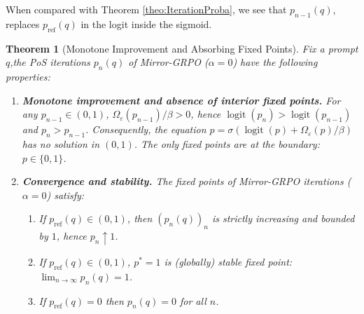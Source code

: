 \documentclass[11pt,reqno]{amsart}
\newtheorem{theorem}{Theorem}
\DeclareMathOperator{\logit}{logit}
\begin{document}
When compared with Theorem \ref{theo:IterationProba}, we see that $p_{n-1}(q)$, replaces $p_{\mathrm{ref}}(q)$ in the logit inside the sigmoid. 

\begin{theorem}[Monotone Improvement and Absorbing Fixed Points]
Fix a prompt $q$,the PoS iterations $p_n(q)$  of Mirror-GRPO ($\alpha=0$) have the following properties:

\begin{enumerate}[leftmargin=1.1em, itemsep=4pt, topsep=4pt]

\item\textbf{Monotone improvement and absence of interior fixed points.}
For any $p_{n-1}\in(0,1)$, $\Omega_\varepsilon(p_{n-1})/\beta>0$, hence $\logit(p_n)>\logit(p_{n-1})$ and $p_n>p_{n-1}$.
Consequently, the equation $p=\sigma(\logit(p)+\Omega_\varepsilon(p)/\beta)$ has \emph{no} solution in $(0,1)$.
The only fixed points are at the boundary: $p\in\{0,1\}$.

\item\textbf{Convergence and stability.} The fixed points of Mirror-GRPO iterations ($\alpha=0$) satisfy:  
\begin{enumerate}[label=(\alph*), itemsep=3pt]
\item If $p_{\mathrm{ref}}(q)\in(0,1)$, then $(p_n(q))_{n}$ is strictly increasing and bounded by $1$, hence $p_n\uparrow 1$.
\item  If $p_{\mathrm{ref}}(q)\in (0,1)$,  $p^*=1$ is (globally)  stable fixed point: $\lim_{n\to\infty}p_n(q)=1$.
\item If $p_{\mathrm{ref}}(q)=0$ then $p_n(q)= 0$ for all $n$.
\end{enumerate}
\end{enumerate}
\end{theorem}
\end{document}
